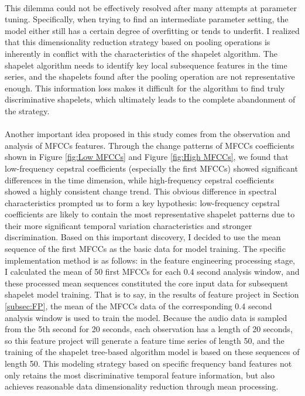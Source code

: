 \\
This dilemma could not be effectively resolved after many attempts at parameter tuning. Specifically, when trying to find an intermediate parameter setting, the model either still has a certain degree of overfitting or tends to underfit. I realized that this dimensionality reduction strategy based on pooling operations is inherently in conflict with the characteristics of the shapelet algorithm. The shapelet algorithm needs to identify key local subsequence features in the time series, and the shapelets found after the pooling operation are not representative enough. This information loss makes it difficult for the algorithm to find truly discriminative shapelets, which ultimately leads to the complete abandonment of the strategy.\\
\\
Another important idea proposed in this study comes from the observation and analysis of MFCCs features. Through the change patterns of MFCCs coefficients shown in Figure \ref{fig:Low MFCCs} and Figure \ref{fig:High MFCCs}, we found that low-frequency cepstral coefficients (especially the first MFCCs) showed significant differences in the time dimension, while high-frequency cepstral coefficients showed a highly consistent change trend. This obvious difference in spectral characteristics prompted us to form a key hypothesis: low-frequency cepstral coefficients are likely to contain the most representative shapelet patterns due to their more significant temporal variation characteristics and stronger discrimination. Based on this important discovery, I decided to use the mean sequence of the first MFCCs as the basic data for model training. The specific implementation method is as follows: in the feature engineering processing stage, I calculated the mean of 50 first MFCCs for each 0.4 second analysis window, and these processed mean sequences constituted the core input data for subsequent shapelet model training. That is to say, in the results of feature project in Section \ref{subsec:FP}, the mean of the MFCCs data of the corresponding 0.4 second analysis window is used to train the model. Because the audio data is sampled from the 5th second for 20 seconds, each observation has a length of 20 seconds, so this feature project will generate a feature time series of length 50, and the training of the shapelet tree-based algorithm model is based on these sequences of length 50. This modeling strategy based on specific frequency band features not only retains the most discriminative temporal feature information, but also achieves reasonable data dimensionality reduction through mean processing.\\
\\
